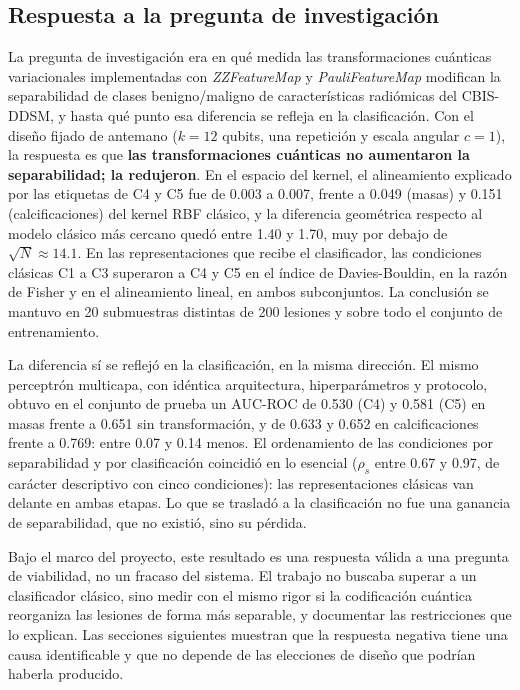 
\subsection{Respuesta a la pregunta de investigación}
\label{sec:respuesta_pregunta}

La pregunta de investigación era en qué medida las transformaciones cuánticas variacionales
implementadas con \textit{ZZFeatureMap} y \textit{PauliFeatureMap} modifican la separabilidad de
clases benigno/maligno de características radiómicas del CBIS-DDSM, y hasta qué punto esa diferencia
se refleja en la clasificación. Con el diseño fijado de antemano ($k = 12$ qubits, una repetición y
escala angular $c = 1$), la respuesta es que \textbf{las transformaciones cuánticas no aumentaron la
separabilidad; la redujeron}. En el espacio del kernel, el alineamiento explicado por las etiquetas de
C4 y C5 fue de 0.003 a 0.007, frente a 0.049 (masas) y 0.151 (calcificaciones) del kernel RBF clásico,
y la diferencia geométrica respecto al modelo clásico más cercano quedó entre 1.40 y 1.70, muy por
debajo de $\sqrt{N} \approx 14.1$. En las representaciones que recibe el clasificador, las condiciones
clásicas C1 a C3 superaron a C4 y C5 en el índice de Davies-Bouldin, en la razón de Fisher y en el
alineamiento lineal, en ambos subconjuntos. La conclusión se mantuvo en 20 submuestras distintas de
200 lesiones y sobre todo el conjunto de entrenamiento.

La diferencia sí se reflejó en la clasificación, en la misma dirección. El mismo perceptrón
multicapa, con idéntica arquitectura, hiperparámetros y protocolo, obtuvo en el conjunto de prueba un
AUC-ROC de 0.530 (C4) y 0.581 (C5) en masas frente a 0.651 sin transformación, y de 0.633 y 0.652 en
calcificaciones frente a 0.769: entre 0.07 y 0.14 menos. El ordenamiento de las condiciones por
separabilidad y por clasificación coincidió en lo esencial ($\rho_s$ entre 0.67 y 0.97, de carácter
descriptivo con cinco condiciones): las representaciones clásicas van delante en ambas etapas. Lo que se
trasladó a la clasificación no fue una ganancia de separabilidad, que no existió, sino su pérdida.

Bajo el marco del proyecto, este resultado es una respuesta válida a una pregunta de viabilidad, no un
fracaso del sistema. El trabajo no buscaba superar a un clasificador clásico, sino medir con el mismo
rigor si la codificación cuántica reorganiza las lesiones de forma más separable, y documentar las
restricciones que lo explican. Las secciones siguientes muestran que la respuesta negativa tiene una
causa identificable y que no depende de las elecciones de diseño que podrían haberla producido.
